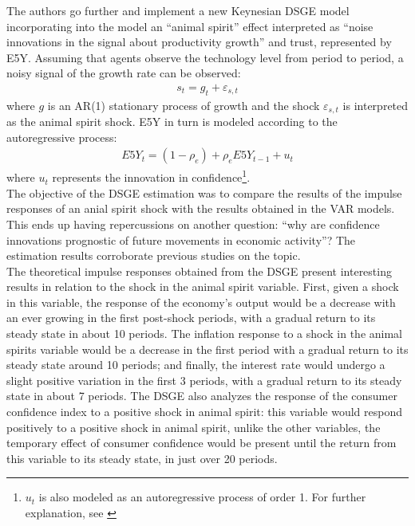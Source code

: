 The authors go further and implement a new Keynesian DSGE model incorporating into the model an ``animal spirit'' effect interpreted as ``noise innovations in the signal about productivity growth''\cite[p.1353]{barsky2012information} and trust, represented by E5Y. Assuming that agents observe the technology level from period to period, a noisy signal of the growth rate can be observed:
\begin{align*}
     s_t = g_t + \varepsilon_{s,t}
\end{align*}
where $g$ is an AR(1) stationary process of growth and the shock $\varepsilon_{s,t}$ is interpreted as the animal spirit shock. E5Y in turn is modeled according to the autoregressive process:
\begin{align*}
     E5Y_t = (1 - \rho_e) + \rho_e E5Y_{t-1} + u_t
\end{align*}
where $u_t$ represents the innovation in confidence\footnote{$u_t$ is also modeled as an autoregressive process of order 1. For further explanation, see \cite[p.1354]{barsky2012information}}.\\

The objective of the DSGE estimation was to compare the results of the impulse responses of an anial spirit shock with the results obtained in the VAR models. This ends up having repercussions on another question: ``why are confidence innovations prognostic of future movements in economic activity''\cite[1356]{barsky2012information}? The estimation results corroborate previous studies \cite{rotemberg1997optimization, christiano2005nominal} on the topic.\\

The theoretical impulse responses obtained from the DSGE present interesting results in relation to the shock in the animal spirit variable. First, given a shock in this variable, the response of the economy's output would be a decrease with an ever growing in the first post-shock periods, with a gradual return to its steady state in about 10 periods. The inflation response to a shock in the animal spirits variable would be a decrease in the first period with a gradual return to its steady state around 10 periods; and finally, the interest rate would undergo a slight positive variation in the first 3 periods, with a gradual return to its steady state in about 7 periods. The DSGE also analyzes the response of the consumer confidence index to a positive shock in animal spirit: this variable would respond positively to a positive shock in animal spirit, unlike the other variables, the temporary effect of consumer confidence would be present until the return from this variable to its steady state, in just over 20 periods.\\

